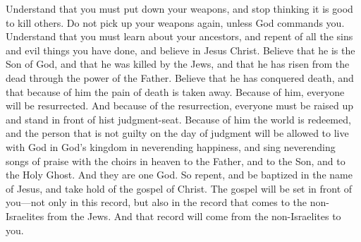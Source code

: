 \bverse \iffalse Know ye that ye must lay down your weapons of war, and delight no more in the shedding of blood, and take them not again, save it be that God shall command you. \fi
Understand that you must put down your weapons, and stop thinking it is good to kill others. Do not pick up your weapons again, unless God commands you.
\bverse \iffalse Know ye that ye must come to the knowledge of your fathers, and repent of all your sins and iniquities, and believe in Jesus Christ, that he is the Son of God, and that he was slain by the Jews, and by the power of the Father he hath risen again, whereby he hath gained the victory over the grave; and also in him is the sting of death swallowed up. \fi
Understand that you must learn about your ancestors, and repent of all the sins and evil things you have done, and believe in Jesus Christ. Believe that he is the Son of God, and that he was killed by the Jews, and that he has risen from the dead through the power of the Father. Believe that he has conquered death, and that because of him the pain of death is taken away.
\bverse \iffalse And he bringeth to pass the resurrection of the dead, whereby man must be raised to stand before his judgment-seat. \fi
Because of him, everyone will be resurrected. And because of the resurrection, everyone must be raised up and stand in front of hist judgment-seat.
\bverse \iffalse And he hath brought to pass the redemption of the world, whereby he that is found guiltless before him at the judgment day hath it given unto him to dwell in the presence of God in his kingdom, to sing ceaseless praises with the choirs above, unto the Father, and unto the Son, and unto the Holy Ghost, which are one God, in a state of happiness which hath no end. \fi
Because of him the world is redeemed, and the person that is not guilty on the day of judgment will be allowed to live with God in God's kingdom in neverending happiness, and sing neverending songs of praise with the choirs in heaven to the Father, and to the Son, and to the Holy Ghost. And they are one God.
\bverse \iffalse Therefore repent, and be baptized in the name of Jesus, and lay hold upon the gospel of Christ, which shall be set before you, not only in this record but also in the record which shall come unto the Gentiles from the Jews, which record shall come from the Gentiles unto you. \fi
So repent, and be baptized in the name of Jesus, and take hold of the gospel of Christ. The gospel will be set in front of you---not only in this record, but also in the record that comes to the non-Israelites from the Jews. And that record will come from the non-Israelites to you.
